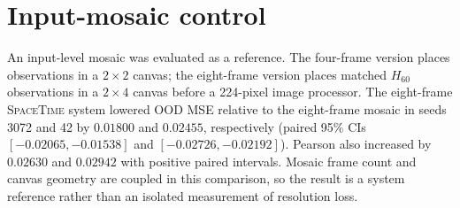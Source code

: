 \documentclass[10pt,a4paper]{article}
\newcommand{\SpaceTime}{\textsc{SpaceTime}}
\begin{document}
\appendix
\section{Input-mosaic control}

An input-level mosaic was evaluated as a reference. The four-frame version places observations in a $2\times2$ canvas; the eight-frame version places matched $H_{60}$ observations in a $2\times4$ canvas before a 224-pixel image processor. The eight-frame \SpaceTime{} system lowered OOD MSE relative to the eight-frame mosaic in seeds 3072 and 42 by $0.01800$ and $0.02455$, respectively (paired 95\% CIs $[-0.02065,-0.01538]$ and $[-0.02726,-0.02192]$). Pearson also increased by $0.02630$ and $0.02942$ with positive paired intervals. Mosaic frame count and canvas geometry are coupled in this comparison, so the result is a system reference rather than an isolated measurement of resolution loss.



\end{document}
